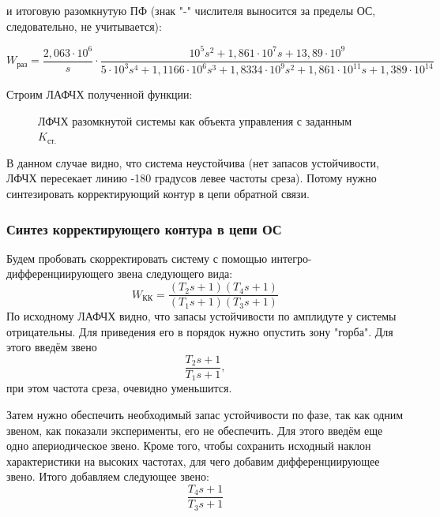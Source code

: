 \documentclass[main.tex]{subfiles}
\begin{document}
и итоговую разомкнутую ПФ (знак "-" числителя выносится за пределы ОС, 
следовательно, не учитывается):

 \[ W_\text{раз} = \frac{2,063 \cdot 10^{6}}{s}\cdot
    \frac{10^5s^2+1,861 \cdot 10^{7}s+13,89 \cdot 10^{9}}
    {5 \cdot 10^{3}s^4 + 1,1166 \cdot 10^{6}s^3 + 1,8334 \cdot 10^{9}s^2 + 
    1,861 \cdot 10^{11}s + 1,389 \cdot 10^{14}}
 \]

 Строим ЛАФЧХ полученной функции:
 \begin{figure}[h]
     \caption{ЛФЧХ разомкнутой системы как объекта управления с заданным \( K_\text{ст.} \)}
 \end{figure}

В данном случае видно, что система неустойчива (нет запасов устойчивости, ЛФЧХ пересекает
линию -180 градусов левее частоты среза). Потому нужно синтезировать 
корректирующий контур в цепи обратной связи.

\subsubsection*{Синтез корректирующего контура в цепи ОС}
Будем пробовать скорректировать систему с помощью интегро-дифференциирующего звена
следующего вида:
 \[ W_\text{КК} = \frac{(T_2s+1)(T_4s+1)}{(T_1s+1)(T_3s+1)} \]
 По исходному ЛАФЧХ видно, что запасы устойчивости по амплидуте у системы отрицательны.
 Для приведения его в порядок нужно опустить зону "горба". Для этого введём звено
  \[ \frac{T_2s+1}{T_1s+1}, \]
при этом частота среза, очевидно уменьшится.\par 
Затем нужно обеспечить необходимый запас устойчивости по фазе, так как одним звеном,
как показали эксперименты, его не обеспечить. Для этого введём еще одно
апериодическое звено. Кроме того, чтобы сохранить исходный 
наклон характеристики на высоких частотах, для чего добавим дифференциирующее звено.
Итого добавляем следующее звено:
 \[ \frac{T_4s+1}{T_3s+1} \]
\end{document}
